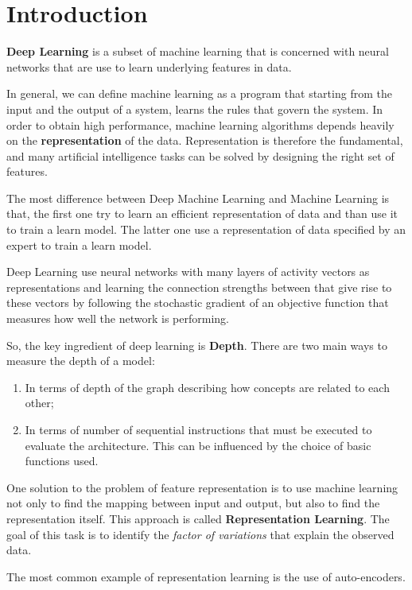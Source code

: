\chapter*{Introduction}
\textbf{Deep Learning} is a subset of machine learning that is concerned with 
neural networks that are use to learn underlying features in data.

In general, we can define machine learning as a program that starting from the 
input and the output of a system, learns the rules that govern the system. In 
order to obtain high performance, machine learning algorithms depends heavily on 
the \textbf{representation} of the data. Representation is therefore the fundamental, 
and many artificial intelligence tasks can be solved by designing the right set of features.

The most difference between Deep Machine Learning and Machine Learning is that, 
the first one try to learn an efficient representation of data and than use it 
to train a learn model. The latter one use a representation of data specified by 
an expert to train a learn model.

Deep Learning use neural networks with many layers of activity vectors as 
representations and learning the connection strengths between that give rise to 
these vectors by following the stochastic gradient of an objective function that
measures how well the network is performing.

So, the key ingredient of deep learning is \textbf{Depth}. There are two main 
ways to measure the depth of a model:
\begin{enumerate}
    \item In terms of depth of the graph describing how concepts are related to
        each other;
    \item In terms of number of sequential instructions that must be executed to 
        evaluate the architecture. This can be influenced by the choice of basic 
        functions used.
\end{enumerate}

One solution to the problem of feature representation is to use machine learning
not only to find the mapping between input and output, but also to find the
representation itself. This approach is called \textbf{Representation Learning}.
The goal of this task is to identify the \textit{factor of variations} that 
explain the observed data.

\begin{note}
    The most common example of representation learning is the use of auto-encoders.
\end{note}

